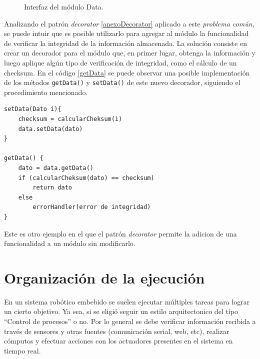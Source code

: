 \begin{figure}[H]
\caption{Interfaz del módulo Data.}
\label{dataInter}
\begin{center}
\end{center}
\end{figure}

Analizando el patrón \textit{decorator} \ref{anexoDecorator} aplicado a este \textit{problema común}, se puede intuir que es posible utilizarlo para agregar al módulo \Data la funcionalidad de verificar la integridad de la información almacenada. La solución consiste en crear un decorador para el módulo \Data que, en primer lugar, obtenga la información y luego aplique algún tipo de verificación de integridad, como el cálculo de un \gls{checksum}. En el código \ref{getData} se puede observar una posible implementación de los métodos \verb|getData()| y \verb|setData()| de este nuevo decorador, siguiendo el procedimiento mencionado.

\begin{lstlisting}[caption=Implementación de los métodos getData y setData del decorador que se encarga de verificar la integridad de la información almacenada en el módulo \Data.,label={getData}]
setData(Dato i){
    checksum = calcularCheksum(i)
    data.setData(dato)
}

getData() {
    dato = data.getData()
    if (calcularCheksum(dato) == checksum)
        return dato
    else
        errorHandler(error de integridad)
}
\end{lstlisting}

Este es otro ejemplo en el que el patrón \textit{decorator} permite la adicion de una funcionalidad a un módulo sin modificarlo.


\section{Organización de la ejecución}
\label{orgEjecucion}

En un sistema robótico embebido se suelen ejecutar múltiples tareas para lograr un cierto objetivo. Ya sea, si se eligió seguir un estilo arquitectonico del tipo ``Control de procesos'' o no. Por lo general se debe verificar información recibida a través de sensores y otras fuentes (comunicación serial, web, etc), realizar cómputos y efectuar acciones con los actuadores presentes en el sistema en tiempo real.

